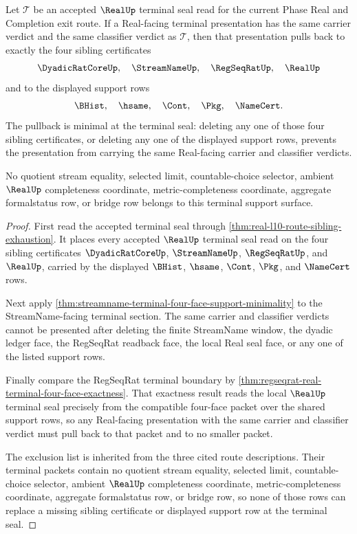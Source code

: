 \begin{theorem}
\label{thm:real-l10-terminal-four-face-support-minimality-pullback}
Let $\mathcal T$ be an accepted $\RealUp$ terminal seal read for the current
Phase Real and Completion exit route. If a Real-facing terminal presentation
has the same carrier verdict and the same classifier verdict as $\mathcal T$,
then that presentation pulls back to exactly the four sibling certificates
$$
\DyadicRatCoreUp,\quad \StreamNameUp,\quad \RegSeqRatUp,\quad \RealUp
$$
and to the displayed support rows
$$
\BHist,\quad \hsame,\quad \Cont,\quad \Pkg,\quad \NameCert.
$$
The pullback is minimal at the terminal seal: deleting any one of those four
sibling certificates, or deleting any one of the displayed support rows,
prevents the presentation from carrying the same Real-facing carrier and
classifier verdicts.

No quotient stream equality, selected limit, countable-choice selector, ambient
$\RealUp$ completeness coordinate, metric-completeness coordinate, aggregate
formalstatus row, or bridge row belongs to this terminal support surface.
\end{theorem}
\begin{proof}
First read the accepted terminal seal through
\autoref{thm:real-l10-route-sibling-exhaustion}. It places every accepted
$\RealUp$ terminal seal read on the four sibling certificates
$\DyadicRatCoreUp$, $\StreamNameUp$, $\RegSeqRatUp$, and $\RealUp$, carried by
the displayed $\BHist$, $\hsame$, $\Cont$, $\Pkg$, and $\NameCert$ rows.

Next apply
\autoref{thm:streamname-terminal-four-face-support-minimality} to the
StreamName-facing terminal section. The same carrier and classifier verdicts
cannot be presented after deleting the finite StreamName window, the dyadic
ledger face, the RegSeqRat readback face, the local Real seal face, or any one
of the listed support rows.

Finally compare the RegSeqRat terminal boundary by
\autoref{thm:regseqrat-real-terminal-four-face-exactness}. That exactness
result reads the local $\RealUp$ terminal seal precisely from the compatible
four-face packet over the shared support rows, so any Real-facing presentation
with the same carrier and classifier verdict must pull back to that packet and
to no smaller packet.

The exclusion list is inherited from the three cited route descriptions. Their
terminal packets contain no quotient stream equality, selected limit,
countable-choice selector, ambient $\RealUp$ completeness coordinate,
metric-completeness coordinate, aggregate formalstatus row, or bridge row, so
none of those rows can replace a missing sibling certificate or displayed
support row at the terminal seal.
\end{proof}

